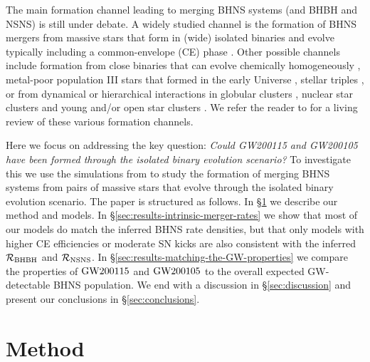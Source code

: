\documentclass{aastex63}
\newcommand{\Rbhbh}{\ensuremath{\mathcal{R}_{\rm{BHBH}}}\xspace}
\newcommand{\Rnsns}{\ensuremath{\mathcal{R}_{\rm{NSNS}}}\xspace}
\newcommand{\gwone}{\ensuremath{\rm{GW200115}}\xspace}
\newcommand{\gwzero}{\ensuremath{\rm{GW200105}}\xspace}
\begin{document}
The main formation channel leading to merging \ac{BHNS} systems (and BHBH and NSNS) is still under debate. A widely studied channel is the formation of \ac{BHNS} mergers from massive stars that form in (wide) isolated binaries and evolve typically including a common-envelope (CE) phase  \citep[e.g.,][]{Neijssel:2019,Belczynski:2020,Shao:2021}. Other possible channels include formation from  close binaries that can evolve chemically homogeneously \citep{MandelDeMink:2016,Marchant:2017}, metal-poor population III stars that formed in the early Universe \citep[e.g.][]{Belczynski:2017popIII}, stellar triples \citep[][]{FragioneLoeb:2019a,HamersThompson:2019}, or from dynamical or hierarchical interactions in globular clusters \citep[][]{Clausen:2013, ArcaSedda:2020, Ye:2019}, nuclear star clusters \citep[][]{PetrovichAntonini:2017, McKernan:2020, Wang:2020} and young and/or open star clusters \citep[e.g.,][]{Ziosi:2014,Rastello:2020}. We refer the reader to \citet[][]{MandelBroekgaardenReview:2021} for a living review of these various formation channels.  

Here we focus on addressing the key question: {\it Could GW200115 and GW200105 have been formed through the isolated binary evolution scenario?} To investigate this we use the simulations from \citet{ZenodoDCOBHNS:2021} to study the formation of merging \ac{BHNS} systems from pairs of massive stars that evolve through the isolated binary evolution scenario. The paper is structured as follows. In \S\ref{sec:method} we describe our method and models.  In \S\ref{sec:results-intrinsic-merger-rates} we show that most of our models do match the inferred \ac{BHNS} rate densities, but that only models with higher \ac{CE} efficiencies or moderate \ac{SN} kicks are also consistent with the inferred \Rbhbh and \Rnsns. In \S\ref{sec:results-matching-the-GW-properties} we compare the properties of \gwone and \gwzero to the overall expected \ac{GW}-detectable \ac{BHNS} population.  We end with a discussion in \S\ref{sec:discussion} and present our conclusions in \S\ref{sec:conclusions}.






\section{Method}
\label{sec:method}
%
\end{document}

